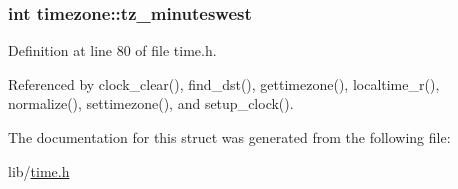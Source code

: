 \subsubsection[{\texorpdfstring{tz\+\_\+minuteswest}{tz_minuteswest}}]{\setlength{\rightskip}{0pt plus 5cm}int timezone\+::tz\+\_\+minuteswest}\hypertarget{structtimezone_a3042f7eff6e1b980728def76b1fa0eb7}{}\label{structtimezone_a3042f7eff6e1b980728def76b1fa0eb7}


Definition at line 80 of file time.\+h.



Referenced by clock\+\_\+clear(), find\+\_\+dst(), gettimezone(), localtime\+\_\+r(), normalize(), settimezone(), and setup\+\_\+clock().



The documentation for this struct was generated from the following file\+:\begin{DoxyCompactItemize}
\item 
lib/\hyperlink{time_8h}{time.\+h}\end{DoxyCompactItemize}
